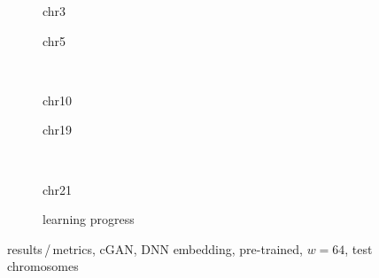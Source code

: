 \begin{figure}[p] %
    \begin{subfigure}{0.45\textwidth}
        \scriptsize
        \caption{chr3}
    \end{subfigure} \hfill
    \begin{subfigure}{0.45\textwidth}
        \scriptsize
        \caption{chr5}
    \end{subfigure}\\[5mm]
    \begin{subfigure}{0.45\textwidth}
        \scriptsize
        \caption{chr10}
    \end{subfigure}\hfill
    \begin{subfigure}{0.45\textwidth}
        \scriptsize
        \caption{chr19}
    \end{subfigure}\\[3mm]
    \begin{subfigure}{0.45\textwidth}
        \scriptsize
        \caption{chr21}
    \end{subfigure} \hfill
    \begin{subfigure}{0.45\textwidth}
        \scriptsize
        \caption{learning progress} \label{fig:results:GAN64_pretrain-dnn_lossEpochs}
    \end{subfigure}
    \caption{results\,/\,metrics, cGAN, DNN embedding, pre-trained, $w=64$, test chromosomes}   \label{fig:results:GAN64_pretrain-dnn_pearson}
\end{figure}
